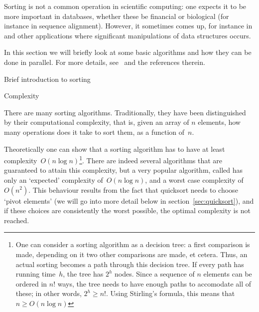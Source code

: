 

\label{sec:sorting}

Sorting is not a common operation in scientific computing: one expects
it to be more important in databases, whether these be financial or
biological (for instance in sequence alignment). However, it sometimes
comes up, for instance in  and other applications where
significant manipulations of data structures occurs.

In this section we will briefly look at some basic 
algorithms and how they can be done in parallel. For more details,
see~\cite{Kumar:parcomp-book} and the references therein.

 {Brief introduction to sorting}

 {Complexity}

There are many sorting algorithms. Traditionally, they have 
been distinguished by
their computational complexity, that is, given an array of $n$
elements, how many operations does it take to sort them, as a function
of~$n$. 

Theoretically one can show that a sorting algorithm has to have at
least complexity~$O(n\log n)$\footnote{One can consider a sorting
  algorithm as a decision tree: a first comparison is made, depending
  on it two other comparisons are made, et cetera. Thus, an actual
  sorting becomes a path through this decision tree. If every path has
  running time~$h$, the tree has $2^h$ nodes. Since a sequence of $n$
  elements can be ordered in $n!$ ways, the tree needs to have enough
  paths to accomodate all of these; in other words, $2^h\geq
  n!$. Using Stirling's formula, this means that $n\geq O(n\log
  n)$}. There are indeed several algorithms that are guaranteed to
attain this complexity, but a very popular algorithm, called
 has only an `expected' complexity of~$O(n\log
n)$, and a worst case complexity of~$O(n^2)$. This behaviour results
from the fact that quicksort needs to choose `pivot elements' (we will
go into more detail below in section~\ref{sec:quicksort}), and if
these choices are consistently the worst possible, the optimal
complexity is not reached.

